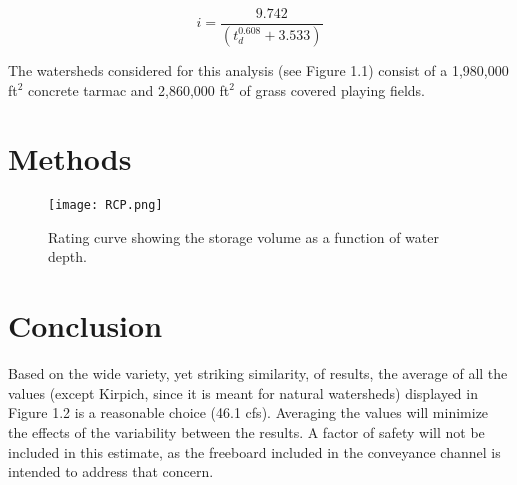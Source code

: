 \documentclass[11pt,letterpaper,final]{report}
\begin{document}
\begin{equation}
    i=\dfrac{9.742}{\left(t_d^{0.608}+3.533\right)}
\end{equation}

The watersheds considered for this analysis (see Figure 1.1) consist of a 1,980,000 ft$^2$ concrete tarmac and 2,860,000 ft$^2$ of grass covered playing fields. 

\section{Methods}

\begin{figure}[H]
    \centering
    \texttt{[image: RCP.png]}

    \caption{Rating curve showing the storage volume as a function of water depth.}
\end{figure}



\section{Conclusion}

Based on the wide variety, yet striking similarity, of results, the average of all the values (except Kirpich, since it is meant for natural watersheds) displayed in Figure 1.2 is a reasonable choice (46.1 cfs). Averaging the values will minimize the effects of the variability between the results. A factor of safety will not be included in this estimate, as the freeboard included in the conveyance channel is intended to address that concern. 



\setcounter{figure}{0}
\setcounter{section}{0} 
\end{document}
